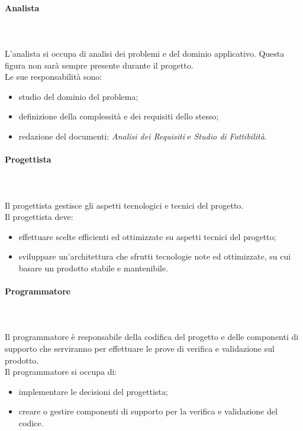 			\paragraph{Analista} \mbox{}\\ \mbox{}\\
			L'analista si occupa di analisi dei problemi e del dominio applicativo. Questa figura non sarà sempre presente durante il progetto. \\
			Le sue responsabilità sono:
			\begin{itemize}
				\item studio del dominio del problema;
				\item definizione della complessità  e dei requisiti dello stesso;
				\item redazione del documenti: \textit{Analisi dei Requisiti} e \textit{Studio di Fattibilità}.
			\end{itemize}
			\paragraph{Progettista} \mbox{}\\ \mbox{}\\
			Il progettista gestisce gli aspetti tecnologici e tecnici del progetto.\\
			Il progettista deve:
			\begin{itemize}
				\item effettuare scelte efficienti ed ottimizzate su aspetti tecnici del progetto;
				\item sviluppare un'architettura che sfrutti tecnologie note ed ottimizzate, su cui basare un prodotto stabile e mantenibile.
			\end{itemize}
			\paragraph{Programmatore} \mbox{}\\ \mbox{}\\
			Il programmatore è responsabile della codifica del progetto e delle componenti di supporto che serviranno per effettuare le prove di verifica e validazione sul prodotto.\\
			Il programmatore si occupa di:
			\begin{itemize}
				\item implementare le decisioni del progettista;
				\item creare o gestire componenti di supporto per la verifica e validazione del codice.
			\end{itemize}
